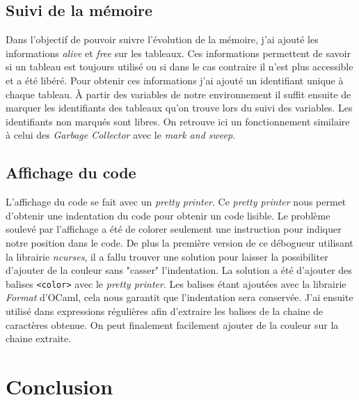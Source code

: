 \documentclass{article}
\begin{document}
\subsection{Suivi de la mémoire}
Dans l'objectif de pouvoir suivre l'évolution de la mémoire, j'ai ajouté 
les informations \textit{alive} et \textit{free} sur les tableaux. Ces 
informations permettent de savoir si un tableau est toujours utilisé ou si 
dans le cas contraire il n'est plus accessible et a été libéré. Pour obtenir 
ces informations j'ai ajouté un identifiant unique à chaque tableau. À partir des 
variables de notre environnement il suffit ensuite de marquer les identifiants des 
tableaux qu'on trouve lors du suivi des variables. Les identifiants non marqués sont 
libres. On retrouve ici un fonctionnement similaire à celui des \textit{Garbage Collector} 
avec le \textit{mark and sweep}.

\subsection{Affichage du code}
L'affichage du code se fait avec un \textit{pretty printer}. Ce \textit{pretty printer} nous 
permet d'obtenir une indentation du code pour obtenir un code lisible. Le 
problème soulevé par l'affichage a été de colorer seulement une instruction pour 
indiquer notre position dans le code. De plus la première version de ce débogueur 
utilisant la librairie \textit{ncurses}, il a fallu trouver une solution pour laisser 
la possibiliter d'ajouter de la couleur sans "casser" l'indentation. La solution 
a été d'ajouter des balises \verb|<color>| avec le \textit{pretty printer}. Les 
balises étant ajoutées avec la librairie \textit{Format} d'OCaml, cela nous garantit 
que l'indentation sera conservée. J'ai ensuite utilisé dans expressions régulières afin 
d'extraire les balises de la chaine de caractères obtenue. On peut finalement facilement 
ajouter de la couleur sur la chaine extraite.

\section{Conclusion}
\end{document}
